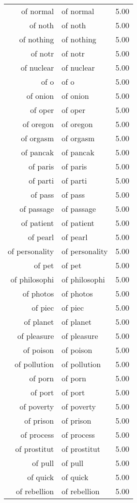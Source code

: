 \begin{table}[ht]
\begin{tabular}{rlr}
  of normal & of normal & 5.00 \\ 
  of noth & of noth & 5.00 \\ 
  of nothing & of nothing & 5.00 \\ 
  of notr & of notr & 5.00 \\ 
  of nuclear & of nuclear & 5.00 \\ 
  of o & of o & 5.00 \\ 
  of onion & of onion & 5.00 \\ 
  of oper & of oper & 5.00 \\ 
  of oregon & of oregon & 5.00 \\ 
  of orgasm & of orgasm & 5.00 \\ 
  of pancak & of pancak & 5.00 \\ 
  of paris & of paris & 5.00 \\ 
  of parti & of parti & 5.00 \\ 
  of pass & of pass & 5.00 \\ 
  of passage & of passage & 5.00 \\ 
  of patient & of patient & 5.00 \\ 
  of pearl & of pearl & 5.00 \\ 
  of personality & of personality & 5.00 \\ 
  of pet & of pet & 5.00 \\ 
  of philosophi & of philosophi & 5.00 \\ 
  of photos & of photos & 5.00 \\ 
  of piec & of piec & 5.00 \\ 
  of planet & of planet & 5.00 \\ 
  of pleasure & of pleasure & 5.00 \\ 
  of poison & of poison & 5.00 \\ 
  of pollution & of pollution & 5.00 \\ 
  of porn & of porn & 5.00 \\ 
  of port & of port & 5.00 \\ 
  of poverty & of poverty & 5.00 \\ 
  of prison & of prison & 5.00 \\ 
  of process & of process & 5.00 \\ 
  of prostitut & of prostitut & 5.00 \\ 
  of pull & of pull & 5.00 \\ 
  of quick & of quick & 5.00 \\ 
  of rebellion & of rebellion & 5.00 \\ 

\end{tabular}
\end{table}
